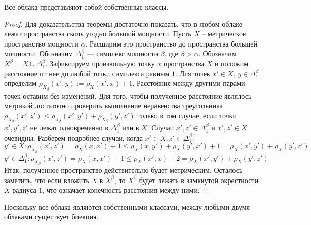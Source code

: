 	\begin{theorem}
		Все облака представляют собой собственные классы.
	\end{theorem}
	\begin{proof}
		Для доказательства теоремы достаточно показать, что в любом облаке лежат пространства сколь угодно большой мощности.
		Пусть $X$ -- метрическое пространство мощности $\alpha$. Расширим это пространство до пространства большей мощности. Обозначим $\Delta^\beta_1$ --- симплекс мощности $\beta$, где $\beta > \alpha$. Обозначим $X^\beta = X \cup \Delta^\beta_1$. Зафиксируем произвольную точку $x$ пространства $X$ и положим расстояние от нее до любой точки симплекса равным $1$. Для точек $x' \in X$, $y \in \Delta^\beta_1$ определим $\rho_{X_\beta}(x',y) := \rho_X(x',x) + 1$. Расстояния между другими парами точек оставим без изменений. Для того, чтобы полученное расстояние являлось метрикой достаточно проверить выполнение неравенства треугольника $\rho_{X_\beta}(x',z') \le \rho_{X_\beta}(x',y') +\rho_{X_\beta}(y',z')$  
		только в том случае, если точки $x', y', z'$ не лежат одновременно в $\Delta^\beta_1$ или в $X$. Случаи $x', z' \in \Delta^\beta_1$ и $ x', z' \in X$ очевидны. Разберем подробнее случаи, когда $x' \in X, z' \in \Delta^\beta_1$:
		$$ y' \in X: \rho_{X_\beta}(x', z') = \rho_X(x,x') + 1 \le \rho_X(x,y') + \rho_X(y',x') + 1 = \rho_X(x',y') + \rho_X(y',z')$$
		$$y' \in \Delta^\beta_1: \rho_{X_\beta}(x', z') = \rho_X(x,x') + 1 \le \rho_X(x',x) + 2 = \rho_X(x',y') + \rho_X(y',z')$$
		Итак, полученное пространство действительно будет метрическим. Осталось заметить, что если вложить $X$ в $X^\beta$, то $X^\beta$ будет лежать в замкнутой окрестности $X$ радиуса 1, что означает конечность расстояния между ними.
 	 \end{proof}
 	 
 	 \begin{remark}
 	 	Поскольку все облака являются собственными классами, между любыми двумя облаками существует биекция.
 	 \end{remark}
 	 
 	 
 	 
	